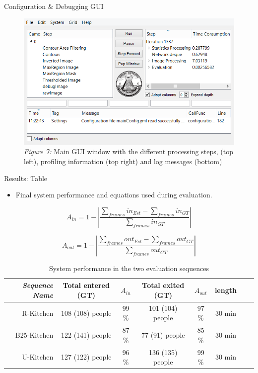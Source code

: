 \documentclass[final,hyperref={pdfpagelabels=false}]{beamer}
\begin{document}
\begin{frame}[t]
\begin{columns}[t]
\begin{column}{.465\textwidth}
\begin{block}{Configuration \& Debugging GUI}
\begin{figure}
\includegraphics[width=0.9\linewidth]{PosterDebuggerCrop.png}
\caption{\centering \textit{Figure 7:} Main GUI window with the different processing steps, (top left), profiling information (top right) and log messages (bottom)}
\end{figure}

\end{block}




\begin{block}{Results: Table}

\begin{itemize}
\item Final system performance and equations used during evaluation.
\end{itemize}

\begin{equation}
\label{eq:in_accuracy}
A_{in} = 1 - |\frac{\sum_{frames}{in_{Est}}-\sum_{frames}{in_{GT}}}{\sum_{frames}in_{GT}}|
\end{equation} 

\begin{equation}
\label{eq:out_accuracy}
A_{out} = 1 - |\frac{\sum_{frames}{out_{Est}}-\sum_{frames}out_{GT}}{\sum_{frames}out_{GT}}| 
\end{equation} 


\begin{table}[h]
\centering
	\begin{tabular}{r | c | c | c | c | c | c | c }
		\emph{Sequence Name}		&  Total entered (GT) & \emph{$A_{in}$} & Total exited (GT) & \emph{$A_{out}$} & length \\
		\hline \hline
		R-Kitchen			& 108 (108) people & 99 \% & 101 (104) people & 97 \% & 30 min\\
		B25-Kitchen			& 122 (141) people & 87 \% & 77 (91) people & 85 \% & 30 min \\
		U-Kitchen			& 127 (122) people & 96 \% & 136 (135) people & 99 \% & 30 min  \\
		\end{tabular}
	\caption{System performance in the two evaluation sequences}
\end{table}
    

\end{block}
\end{column}
\end{columns}
\end{frame}
\end{document}
